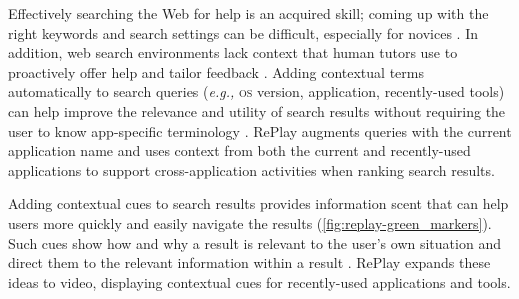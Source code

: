 Effectively searching the Web for help is an acquired skill; coming up with the right keywords and search settings can be difficult, especially for novices \cite{Russell2011}. In addition, web search environments lack context that human tutors use to proactively offer help and tailor feedback \cite{Schon1983}. Adding contextual terms automatically to search queries (\textit{e.g.,} \textsc{os} version, application, recently-used tools) can help improve the relevance and utility of search results without requiring the user to know app-specific terminology \cite{Ekstrand2011, Brandt2010, Matejka2011a}. RePlay augments queries with the current application name and uses context from both the current and recently-used applications to support cross-application activities when ranking search results.

Adding contextual cues to search results provides information scent that can help users more quickly and easily navigate the results (\autoref{fig:replay-green_markers}). Such cues show how and why a result is relevant to the user's own situation and direct them to the relevant information within a result \cite{Ekstrand2011, Fourney2014Intertwine}. RePlay expands these ideas to video, displaying contextual cues for recently-used applications and tools.


